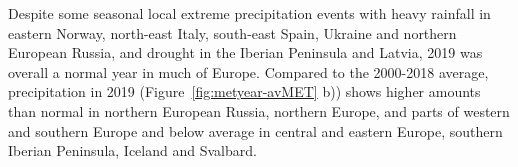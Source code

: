 Despite some seasonal local extreme precipitation events with heavy rainfall in eastern Norway, north-east Italy, south-east Spain, Ukraine and northern European Russia, and drought in the Iberian Peninsula and Latvia, 2019 was overall a normal year in much of Europe.
Compared to the 2000-2018 average, precipitation in 2019 (Figure~\ref{fig:metyear-avMET} b)) shows higher amounts than normal in northern European Russia, northern Europe, and parts of western and southern Europe and below average in central and eastern Europe, southern Iberian Peninsula, Iceland and Svalbard. 
\begin{figure}[h]
  \centering 

\end{figure}
